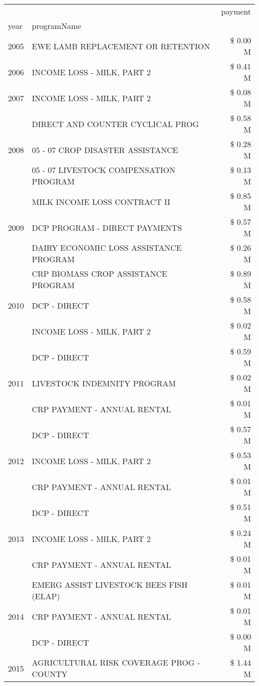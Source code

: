 \begin{tabular}{llr}
\toprule
 &  & payment \\
year & programName &  \\
\midrule
2005 & EWE LAMB REPLACEMENT OR RETENTION & \$ 0.00 M \\
\cline{1-3}
2006 & INCOME LOSS - MILK, PART 2 & \$ 0.41 M \\
\cline{1-3}
2007 & INCOME LOSS - MILK, PART 2 & \$ 0.08 M \\
\cline{1-3}
\multirow[t]{3}{*}{2008} & DIRECT AND COUNTER CYCLICAL PROG & \$ 0.58 M \\
 & 05 - 07 CROP DISASTER ASSISTANCE & \$ 0.28 M \\
 & 05 - 07 LIVESTOCK COMPENSATION PROGRAM & \$ 0.13 M \\
\cline{1-3}
\multirow[t]{3}{*}{2009} & MILK INCOME LOSS CONTRACT II & \$ 0.85 M \\
 & DCP PROGRAM - DIRECT PAYMENTS & \$ 0.57 M \\
 & DAIRY ECONOMIC LOSS ASSISTANCE PROGRAM & \$ 0.26 M \\
\cline{1-3}
\multirow[t]{3}{*}{2010} & CRP BIOMASS CROP ASSISTANCE PROGRAM & \$ 0.89 M \\
 & DCP - DIRECT & \$ 0.58 M \\
 & INCOME LOSS - MILK, PART 2 & \$ 0.02 M \\
\cline{1-3}
\multirow[t]{3}{*}{2011} & DCP - DIRECT & \$ 0.59 M \\
 & LIVESTOCK INDEMNITY PROGRAM & \$ 0.02 M \\
 & CRP PAYMENT - ANNUAL RENTAL & \$ 0.01 M \\
\cline{1-3}
\multirow[t]{3}{*}{2012} & DCP - DIRECT & \$ 0.57 M \\
 & INCOME LOSS - MILK, PART 2 & \$ 0.53 M \\
 & CRP PAYMENT - ANNUAL RENTAL & \$ 0.01 M \\
\cline{1-3}
\multirow[t]{3}{*}{2013} & DCP - DIRECT & \$ 0.51 M \\
 & INCOME LOSS - MILK, PART 2 & \$ 0.24 M \\
 & CRP PAYMENT - ANNUAL RENTAL & \$ 0.01 M \\
\cline{1-3}
\multirow[t]{3}{*}{2014} & EMERG ASSIST LIVESTOCK BEES FISH (ELAP) & \$ 0.01 M \\
 & CRP PAYMENT - ANNUAL RENTAL & \$ 0.01 M \\
 & DCP - DIRECT & \$ 0.00 M \\
\cline{1-3}
\multirow[t]{3}{*}{2015} & AGRICULTURAL RISK COVERAGE PROG - COUNTY & \$ 1.44 M \\

\end{tabular}
